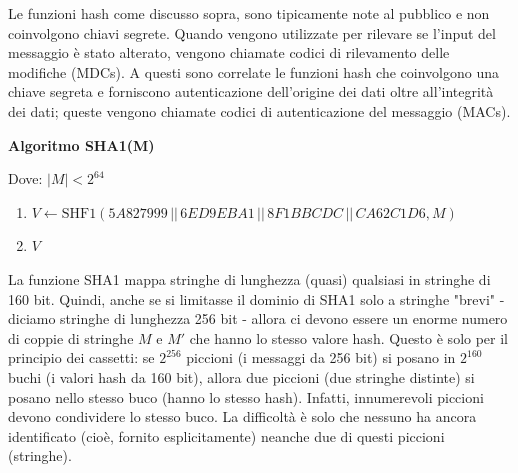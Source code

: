 \documentclass{article}
\theoremstyle{definition}
\begin{document}

Le funzioni hash come discusso sopra, sono tipicamente note al pubblico e non coinvolgono chiavi segrete. Quando vengono utilizzate per rilevare se l'input del messaggio è stato alterato, vengono chiamate codici di rilevamento delle modifiche (MDCs). A questi sono correlate le funzioni hash che coinvolgono una chiave segreta e forniscono autenticazione dell'origine dei dati oltre all'integrità dei dati; queste vengono chiamate codici di autenticazione del messaggio (MACs).

\begin{mdframed}
\begin{center}
    \vspace{10pt}
    \textbf{Algoritmo SHA1(M)}
    \vspace{10pt}
\end{center} 
Dove: $|M| < 2^{64}$
\begin{enumerate}
    \item $V \leftarrow \text{SHF1}( 5A827999 \, || \, 6ED9EBA1 \, || \, 8F1BBCDC \, || \, CA62C1D6, M )$ 
    \item {} $V$
\end{enumerate}
\end{mdframed}

La funzione SHA1 mappa stringhe di lunghezza (quasi) qualsiasi in stringhe di 160 bit. Quindi, anche se si limitasse il dominio di SHA1 solo a stringhe "brevi" - diciamo stringhe di lunghezza 256 bit - allora ci devono essere un enorme numero di coppie di stringhe \( M \) e \( M' \) che hanno lo stesso valore hash. Questo è solo per il principio dei cassetti: se \( 2^{256} \) piccioni (i messaggi da 256 bit) si posano in \( 2^{160} \) buchi (i valori hash da 160 bit), allora due piccioni (due stringhe distinte) si posano nello stesso buco (hanno lo stesso hash). Infatti, innumerevoli piccioni devono condividere lo stesso buco. La difficoltà è solo che nessuno ha ancora identificato (cioè, fornito esplicitamente) neanche due di questi piccioni (stringhe).

\end{document}
